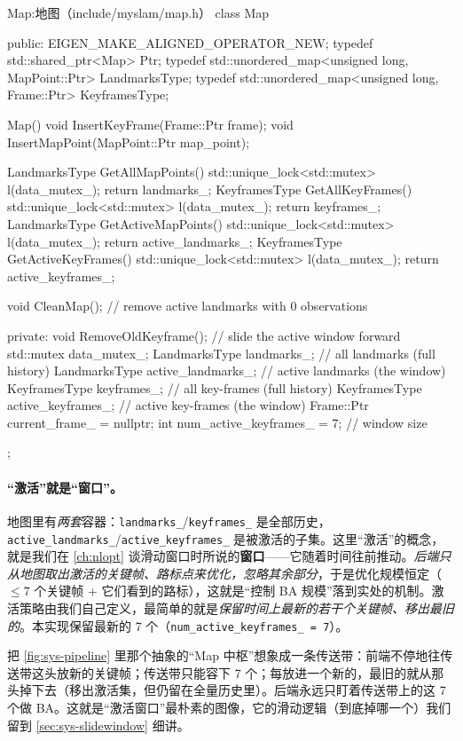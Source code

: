 \begin{codebox}[C++]{Map:地图（include/myslam/map.h）}
class Map {
   public:
    EIGEN_MAKE_ALIGNED_OPERATOR_NEW;
    typedef std::shared_ptr<Map> Ptr;
    typedef std::unordered_map<unsigned long, MapPoint::Ptr> LandmarksType;
    typedef std::unordered_map<unsigned long, Frame::Ptr> KeyframesType;

    Map() {}
    void InsertKeyFrame(Frame::Ptr frame);
    void InsertMapPoint(MapPoint::Ptr map_point);

    LandmarksType GetAllMapPoints()    { std::unique_lock<std::mutex> l(data_mutex_); return landmarks_; }
    KeyframesType GetAllKeyFrames()    { std::unique_lock<std::mutex> l(data_mutex_); return keyframes_; }
    LandmarksType GetActiveMapPoints() { std::unique_lock<std::mutex> l(data_mutex_); return active_landmarks_; }
    KeyframesType GetActiveKeyFrames() { std::unique_lock<std::mutex> l(data_mutex_); return active_keyframes_; }

    void CleanMap();                    // remove active landmarks with 0 observations

   private:
    void RemoveOldKeyframe();           // slide the active window forward
    std::mutex data_mutex_;
    LandmarksType landmarks_;           // all landmarks (full history)
    LandmarksType active_landmarks_;    // active landmarks (the window)
    KeyframesType keyframes_;           // all key-frames (full history)
    KeyframesType active_keyframes_;    // active key-frames (the window)
    Frame::Ptr current_frame_ = nullptr;
    int num_active_keyframes_ = 7;      // window size
};
\end{codebox}

\paragraph{“激活”就是“窗口”。}
地图里有\emph{两套}容器：\texttt{landmarks\_}/\allowbreak\texttt{keyframes\_} 是全部历史，\texttt{active\_landmarks\_}/\allowbreak\texttt{active\_keyframes\_} 是被激活的子集。这里“激活”的概念，就是我们在 \cref{ch:nlopt} 谈滑动窗口时所说的\textbf{窗口}——它随着时间往前推动。\emph{后端只从地图取出激活的关键帧、路标点来优化，忽略其余部分}，于是优化规模恒定（$\le 7$ 个关键帧 + 它们看到的路标），这就是“控制 BA 规模”落到实处的机制。激活策略由我们自己定义，最简单的就是\emph{保留时间上最新的若干个关键帧、移出最旧的}。本实现保留最新的 7 个（\texttt{num\_active\_keyframes\_ = 7}）。

\begin{insight}
把 \cref{fig:sys-pipeline} 里那个抽象的“Map 中枢”想象成一条传送带：前端不停地往传送带这头放新的关键帧；传送带只能容下 7 个；每放进一个新的，最旧的就从那头掉下去（移出激活集，但仍留在全量历史里）。后端永远只盯着传送带上的这 7 个做 BA。这就是“激活窗口”最朴素的图像，它的滑动逻辑（到底掉哪一个）我们留到 \cref{sec:sys-slidewindow} 细讲。
\end{insight}


